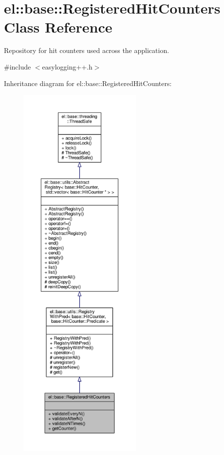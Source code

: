 \hypertarget{classel_1_1base_1_1RegisteredHitCounters}{}\section{el\+:\+:base\+:\+:Registered\+Hit\+Counters Class Reference}
\label{classel_1_1base_1_1RegisteredHitCounters}


Repository for hit counters used across the application.  




{\ttfamily \#include $<$easylogging++.\+h$>$}



Inheritance diagram for el\+:\+:base\+:\+:Registered\+Hit\+Counters\+:
\nopagebreak
\begin{figure}[H]
\begin{center}
\leavevmode
\includegraphics[height=550pt]{da/dc3/classel_1_1base_1_1RegisteredHitCounters__inherit__graph}
\end{center}
\end{figure}


